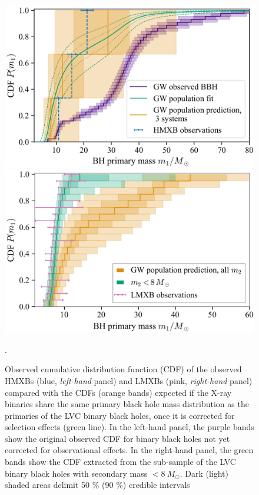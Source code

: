 \documentclass[a4paper,titlepage]{book}     	%
\newcommand{\sun}{\ensuremath{_\odot}}
\newcommand{\msun}{\ensuremath{M\sun}}
\begin{document}
\begin{figure}[h]
	\begin{minipage}{.49\textwidth}
		\centering
		\includegraphics[width=\textwidth]{./images/tensionHMXBHmass.png}
	\end{minipage}
	\hfill
	\begin{minipage}{.49\textwidth}
		\vspace{.5mm}
		\centering
		\includegraphics[width=\textwidth]{./images/tensionLMXBHmass.png}	
	\end{minipage}
	\caption{Observed cumulative distribution function (CDF) of the observed HMXBs (blue, \emph{left-hand} panel) and LMXBs (pink, \emph{right-hand} panel) compared with the CDFs (orange bands) expected if the X-ray binaries share the same primary black hole mass distribution as the primaries of the LVC binary black holes, once it is corrected for selection effects (green line). In the left-hand panel, the purple bands show the original observed CDF for binary black holes not yet corrected for observational effects. In the right-hand panel, the green bands show the CDF extracted from the sub-sample of the LVC binary black holes with secondary mass $< 8~\msun$. Dark (light) shaded areas delimit 50 \% (90 \%) credible intervals \cite{HMXBH_spins2021}}.\label{fig:tensionmass}
\end{figure}
\end{document}
